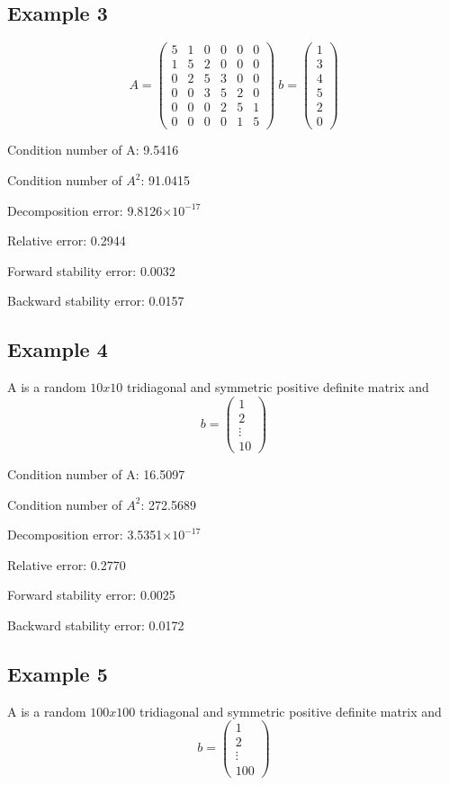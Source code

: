 \documentclass[12pt]{article}
\providecommand{\e}[1]{\ensuremath{\times 10^{#1}}}
\begin{document}
\subsection{Example 3}
$$A=\left(\begin{array}{cccccc} 5 & 1 & 0 & 0 & 0 & 0\\ 1 & 5 & 2 & 0 & 0 & 0\\ 0 & 2 & 5 & 3 & 0 & 0\\ 0 & 0 & 3 & 5 & 2 & 0\\ 0 & 0 & 0 & 2 & 5 & 1\\ 0 & 0 & 0 & 0 & 1 & 5 \end{array}\right)\
b=\left(\begin{array}{c} 1\\ 3\\ 4\\ 5\\ 2\\ 0 \end{array}\right)
$$

Condition number of A: 
    9.5416

Condition number of $A^2$: 
   91.0415

Decomposition error:
   9.8126\e{-17}

Relative error:
    0.2944

Forward stability error:
    0.0032

Backward stability error:
    0.0157

\subsection{Example 4}
A is a random $10x10$ tridiagonal and symmetric positive definite matrix and $$b=\left(\begin{array}{c} 1\\ 2\\ \vdots\\ 10 \end{array}\right)$$ 

Condition number of A: 
   16.5097

Condition number of $A^2$: 
  272.5689

Decomposition error:
   3.5351\e{-17}

Relative error:
    0.2770

Forward stability error:
    0.0025

Backward stability error:
    0.0172

\subsection{Example 5}
A is a random $100x100$ tridiagonal and symmetric positive definite matrix and $$b=\left(\begin{array}{c} 1\\ 2\\ \vdots\\ 100 \end{array}\right)$$ 
\end{document}
